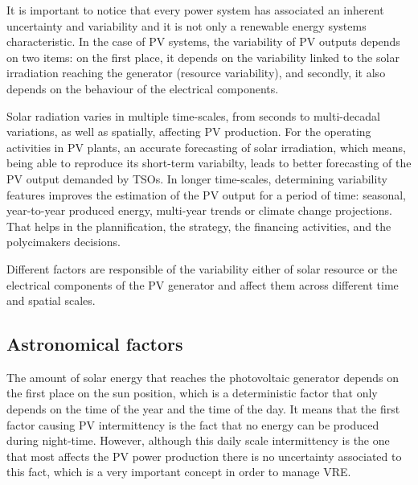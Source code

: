 It is important to notice that every power system has associated an inherent uncertainty and variability and it is not only a renewable energy systems characteristic. In the case of PV systems, the variability of PV outputs depends on two items: on the first place, it depends on the variability linked to the solar irradiation reaching the generator (resource variability), and secondly, it also depends on the behaviour of the electrical components.  

{\color{red}Solar radiation varies in multiple time-scales, from seconds to multi-decadal variations, as well as spatially, affecting PV production. For the operating activities in PV plants, an accurate forecasting of solar irradiation, which means, being able to reproduce its short-term variabilty, leads to better forecasting of the PV output demanded by TSOs. In longer time-scales, determining variability features improves the estimation of the PV output for a period of time: seasonal, year-to-year produced energy, multi-year trends or climate change projections. That helps in the plannification, the strategy, the financing activities, and the polycimakers decisions.}  

{\color{red}Different factors are responsible of the variability either of solar resource or the electrical components of the PV generator and affect them across different time and spatial scales.}

\subsection{Astronomical factors}

The amount of solar energy that reaches the photovoltaic generator depends on the first place on the sun position, which is a deterministic factor that only depends on the time of the year and the time of the day. It means that the first factor causing PV intermittency is the fact that no energy can be produced during night-time. However, although this daily scale intermittency is the one that most affects the PV power production there is no uncertainty associated to this fact, which is a very important concept in order to manage VRE.

